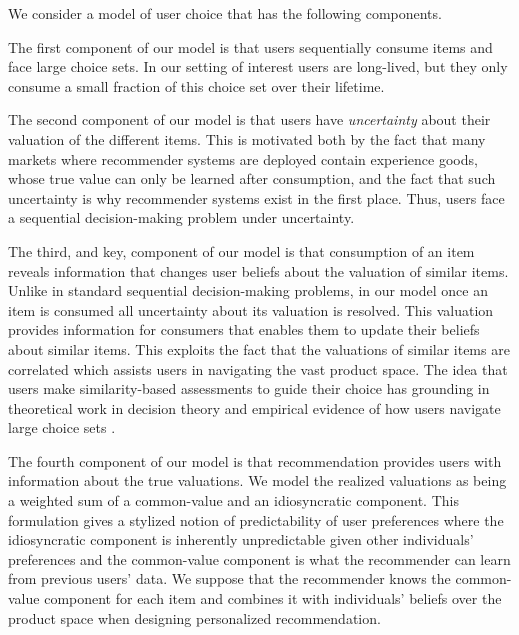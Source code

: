 \documentclass[format=acmsmall, review=false]{acmart}
\newcommand{\xhdr}[1]{\vspace{1mm} \noindent{\bf #1}}
\begin{document}
\xhdr{Our Model} We consider a model of user choice that has the following components.
\par
The first component of our model is that users sequentially consume items and face large choice sets. In our setting of interest users are long-lived, but they only consume a small fraction of this choice set over their lifetime.
\par
The second component of our model is that users have \textit{uncertainty} about their valuation of the different items. This is motivated both by the fact that many markets where recommender systems are deployed contain experience goods, whose true value can only be learned after consumption, and the fact that such uncertainty is why recommender systems exist in the first place. Thus, users face a sequential decision-making problem under uncertainty.
\par 
The third, and key, component of our model is that consumption of an item reveals information that changes user beliefs about the valuation of similar items. Unlike in standard sequential decision-making problems, in our model once an item is consumed all uncertainty about its valuation is resolved. This valuation provides information for consumers that enables them to update their beliefs about similar items. This exploits the fact that the valuations of similar items are correlated which assists users in navigating the vast product space. The idea that users make similarity-based assessments to guide their choice has grounding in theoretical work in decision theory \cite{gilboa1995case} and empirical evidence of how users navigate large choice sets \cite{schulz2019structured}.
\par 
The fourth component of our model is that recommendation provides users with information about the true valuations. We model the realized valuations as being a weighted sum of a common-value and an idiosyncratic component. This formulation gives a stylized notion of predictability of user preferences where the idiosyncratic component is inherently unpredictable given other individuals' preferences and the common-value component is what the recommender can learn from previous users' data. We suppose that the recommender knows the common-value component for each item and combines it with individuals' beliefs over the product space when designing personalized recommendation.
\end{document}

